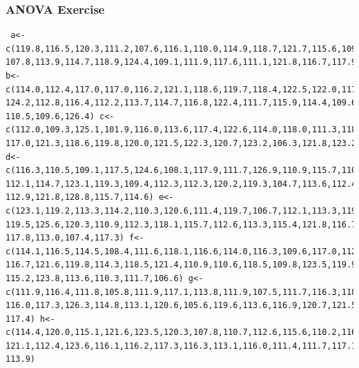 \documentclass[xcolor=dvipsnames]{beamer} \usepackage{teachbeamer}
\begin{document}
\begin{frame}[fragile]
  \frametitle{ANOVA Exercise}
  \begin{scriptsize}
\begin{verbatim} a<-c(119.8,116.5,120.3,111.2,107.6,116.1,110.0,114.9,118.7,121.7,115.6,109.4, 107.8,113.9,114.7,118.9,124.4,109.1,111.9,117.6,111.1,121.8,116.7,117.9,117.9) b<-c(114.0,112.4,117.0,117.0,116.2,121.1,118.6,119.7,118.4,122.5,122.0,117.8, 124.2,112.8,116.4,112.2,113.7,114.7,116.8,122.4,111.7,115.9,114.4,109.6,123.2, 110.5,109.6,126.4) c<-c(112.0,109.3,125.1,101.9,116.0,113.6,117.4,122.6,114.0,118.0,111.3,118.4, 117.0,121.3,118.6,119.8,120.0,121.5,122.3,120.7,123.2,106.3,121.8,123.2) d<-c(116.3,110.5,109.1,117.5,124.6,108.1,117.9,111.7,126.9,110.9,115.7,110.8, 112.1,114.7,123.1,119.3,109.4,112.3,112.3,120.2,119.3,104.7,113.6,112.4,115.2, 112.9,121.8,128.8,115.7,114.6) e<-c(123.1,119.2,113.3,114.2,110.3,120.6,111.4,119.7,106.7,112.1,113.3,119.3, 119.5,125.6,120.3,110.9,112.3,118.1,115.7,112.6,113.3,115.4,121.8,116.7,109.1, 117.8,113.0,107.4,117.3) f<-c(114.1,116.5,114.5,108.4,111.6,118.1,116.6,114.0,116.3,109.6,117.0,112.0, 116.7,121.6,119.8,114.3,118.5,121.4,110.9,110.6,118.5,109.8,123.5,119.9,114.1, 115.2,123.8,113.6,110.3,111.7,106.6) g<-c(111.9,116.4,111.8,105.8,111.9,117.1,113.8,111.9,107.5,111.7,116.3,118.4, 116.0,117.3,126.3,114.8,113.1,120.6,105.6,119.6,113.6,116.9,120.7,121.5,117.1, 117.4) h<-c(114.4,120.0,115.1,121.6,123.5,120.3,107.8,110.7,112.6,115.6,110.2,116.3, 121.1,112.4,123.6,116.1,116.2,117.3,116.3,113.1,116.0,111.4,111.7,117.1,116.2, 113.9)
\end{verbatim}
  \end{scriptsize}
\end{frame}

\end{document}
